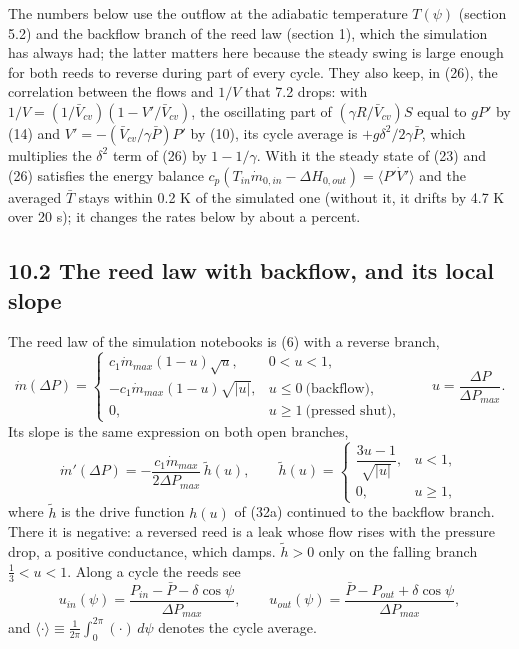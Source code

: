 \documentclass[11pt]{article}
\begin{document}
The numbers below use the outflow at the adiabatic temperature $T(\psi)$ (section 5.2) and the backflow branch of the reed law (section 1), which the simulation has always had; the latter matters here because the steady swing is large enough for both reeds to reverse during part of every cycle. They also keep, in (26), the correlation between the flows and $1/V$ that 7.2 drops: with $1/V = (1/\bar V_{cv})(1 - V'/\bar V_{cv})$, the oscillating part of $(\gamma R/\bar V_{cv})S$ equal to $gP'$ by (14) and $V' = -(\bar V_{cv}/\gamma\bar P)P'$ by (10), its cycle average is $+g\delta^2/2\gamma\bar P$, which multiplies the $\delta^2$ term of (26) by $1 - 1/\gamma$. With it the steady state of (23) and (26) satisfies the energy balance $c_p(T_{in}\dot m_{0,in} - \Delta H_{0,out}) = \langle P'\dot V'\rangle$ and the averaged $\bar T$ stays within 0.2 K of the simulated one (without it, it drifts by 4.7 K over 20 s); it changes the rates below by about a percent.

\subsection*{10.2 The reed law with backflow, and its local slope}

The reed law of the simulation notebooks is (6) with a reverse branch,
\begin{equation}
\dot m(\Delta P) = \begin{cases} c_1\dot m_{max}(1-u)\sqrt u, & 0 < u < 1, \\[2pt] -c_1\dot m_{max}(1-u)\sqrt{\lvert u\rvert}, & u \le 0 \ \text{(backflow)}, \\[2pt] 0, & u \ge 1 \ \text{(pressed shut)}, \end{cases} \qquad u = \frac{\Delta P}{\Delta P_{max}} . \tag{35}
\end{equation}
Its slope is the same expression on both open branches,
\begin{equation}
\dot m'(\Delta P) = -\frac{c_1\dot m_{max}}{2\Delta P_{max}}\,\tilde h(u), \qquad
\tilde h(u) = \begin{cases} \dfrac{3u-1}{\sqrt{\lvert u\rvert}}, & u < 1, \\[6pt] 0, & u \ge 1 , \end{cases} \tag{36}
\end{equation}
where $\tilde h$ is the drive function $h(u)$ of (32a) continued to the backflow branch. There it is negative: a reversed reed is a leak whose flow rises with the pressure drop, a positive conductance, which damps. $\tilde h > 0$ only on the falling branch $\tfrac13 < u < 1$. Along a cycle the reeds see
\[
u_{in}(\psi) = \frac{P_{in} - \bar P - \delta\cos\psi}{\Delta P_{max}}, \qquad u_{out}(\psi) = \frac{\bar P - P_{out} + \delta\cos\psi}{\Delta P_{max}},
\]
and $\langle\cdot\rangle \equiv \frac{1}{2\pi}\int_0^{2\pi}(\cdot)\,d\psi$ denotes the cycle average.
\end{document}
